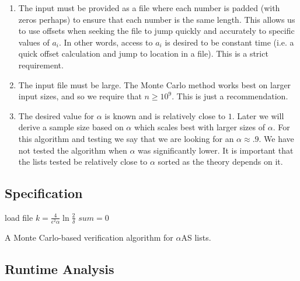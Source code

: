 \documentclass[11pt]{article}
\begin{document}
\begin{enumerate}
\item The input must be provided as a file where each number is padded (with zeros perhaps) to ensure that each number is the same length. This allows us to use offsets when seeking the file to jump quickly and accurately to specific values of $a_i$. In other words, access to $a_i$ is desired to be constant time (i.e. a quick offset calculation and jump to location in a file). This is a strict requirement. 

\item The input file must be large. The Monte Carlo method works best on larger input sizes, and so we require that $n \geq 10^9$. This is just a recommendation.

\item The desired value for $\alpha$ is known and is relatively close to $1$. Later we will derive a sample size based on $\alpha$ which scales best with larger sizes of $\alpha$. For this algorithm and testing we say that we are looking for an $\alpha \approx .9$. We have not tested the algorithm when $\alpha$ was significantly lower. It is important that the lists tested be relatively close to $\alpha$ sorted as the theory depends on it. 
\end{enumerate}

\subsection{Specification}

\begin{algorithm}[H]
 
 	load file\;
 	$k = \frac{4}{\epsilon^2 \alpha} \ln \frac{2}{\delta}$\;
	$sum = 0$\; 
 
 	
 	\caption{A Monte Carlo-based verification algorithm for $\alpha$AS lists.}
\end{algorithm}

\subsection{Runtime Analysis}
\end{document}
